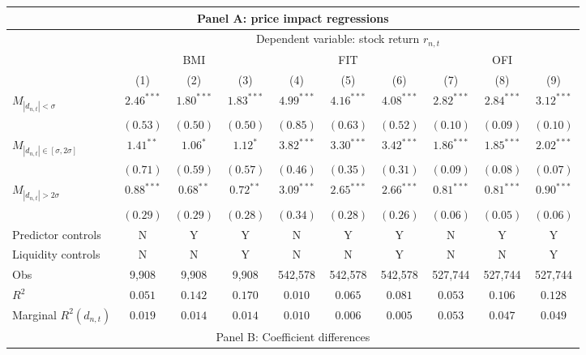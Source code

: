 \begin{tabular}{lccccccccc}
  \hline \multicolumn{10}{c}{Panel A: price impact regressions} \\
 \hline
                                    & \multicolumn{9}{c}{Dependent variable: stock return $r_{n,t}$} \\

                                    \cmidrule(l){2-10} & \multicolumn{3}{c}{BMI} & \multicolumn{3}{c}{FIT} & \multicolumn{3}{c}{OFI} \\
 \cmidrule(l){2-4} \cmidrule(l){5-7} \cmidrule(l){8-10} 
  & (1) & (2) & (3) & (4) & (5) & (6) & (7) & (8) & (9) \\ 
  $M_{|d_{n,t}| < \sigma}$ & $2.46^{***}$ & $1.80^{***}$ & $1.83^{***}$ & $4.99^{***}$ & $4.16^{***}$ & $4.08^{***}$ & $2.82^{***}$ & $2.84^{***}$ & $3.12^{***}$ \\ 
   & $(0.53)$ & $(0.50)$ & $(0.50)$ & $(0.85)$ & $(0.63)$ & $(0.52)$ & $(0.10)$ & $(0.09)$ & $(0.10)$ \\ 
  $M_{|d_{n,t}| \in [\sigma, 2\sigma]}$ & $1.41^{**}$ & $1.06^{*}$ & $1.12^{*}$ & $3.82^{***}$ & $3.30^{***}$ & $3.42^{***}$ & $1.86^{***}$ & $1.85^{***}$ & $2.02^{***}$ \\ 
   & $(0.71)$ & $(0.59)$ & $(0.57)$ & $(0.46)$ & $(0.35)$ & $(0.31)$ & $(0.09)$ & $(0.08)$ & $(0.07)$ \\ 
  $M_{|d_{n,t}| > 2 \sigma}$ & $0.88^{***}$ & $0.68^{**}$ & $0.72^{**}$ & $3.09^{***}$ & $2.65^{***}$ & $2.66^{***}$ & $0.81^{***}$ & $0.81^{***}$ & $0.90^{***}$ \\ 
   \vspace{5pt} & $(0.29)$ & $(0.29)$ & $(0.28)$ & $(0.34)$ & $(0.28)$ & $(0.26)$ & $(0.06)$ & $(0.05)$ & $(0.06)$ \\ 
  Predictor controls & N & Y & Y & N & Y & Y & N & Y & Y \\ 
   \vspace{5pt}Liquidity controls & N & N & Y & N & N & Y & N & N & Y \\ 
  Obs & 9,908 & 9,908 & 9,908 & 542,578 & 542,578 & 542,578 & 527,744 & 527,744 & 527,744 \\ 
  $R^2$ & $0.051$ & $0.142$ & $0.170$ & $0.010$ & $0.065$ & $0.081$ & $0.053$ & $0.106$ & $0.128$ \\ 
  Marginal $R^2(d_{n,t})$ & $0.019$ & $0.014$ & $0.014$ & $0.010$ & $0.006$ & $0.005$ & $0.053$ & $0.047$ & $0.049$ \\ 
   \hline \multicolumn{10}{c}{Panel B: Coefficient differences} \\

\end{tabular}
